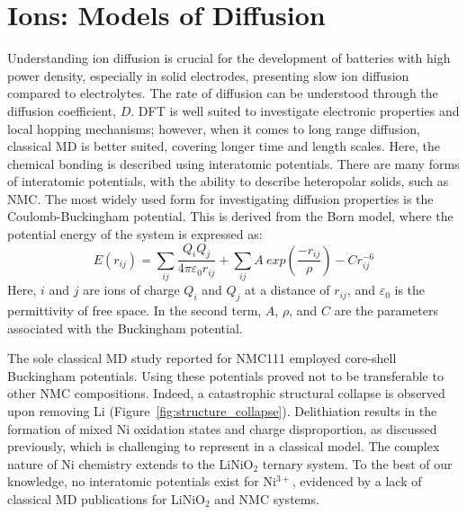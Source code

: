 \documentclass[journal=jacsat,manuscript=article]{achemso}
\begin{document}
\section*{Ions: Models of Diffusion}
Understanding ion diffusion is crucial for the development of batteries with high power density, especially in solid electrodes, presenting slow ion diffusion compared to electrolytes. 
The rate of diffusion can be understood through the diffusion coefficient, $D$. 
DFT is well suited to investigate electronic properties and local hopping mechanisms;\cite{van_der_ven_layered_2001, van_der_ven_LiTiS2_2008} however, when it comes to long range diffusion, classical MD is better suited, covering longer time and length scales. 
Here, the chemical bonding is described using interatomic potentials. 
There are many forms of interatomic potentials, with the ability to describe heteropolar solids, such as NMC. 
The most widely used form for investigating diffusion properties is the Coulomb-Buckingham potential.\cite{buckingham_classical_1938} 
This is derived from the Born model\cite{born_1932, mayer_1932}, where the potential energy of the system is expressed as:
%
\begin{equation}
    E(r_{ij}) =  \sum_{ij} \frac{Q_i Q_j}{4\pi \varepsilon_0 r_{ij}} + \sum_{ij} A \ exp(\frac{-r_{ij}}{\rho}) - Cr_{ij}^{-6}
\end{equation}
%
Here, $i$ and $j$ are ions of charge $Q_i$ and $Q_j$ at a distance of $r_{ij}$, and $\varepsilon_0$ is the permittivity of free space. In the second term, $A$, $\rho$, and $C$ are the parameters associated with the Buckingham potential.

The sole classical MD study reported for NMC111 employed core-shell Buckingham potentials.\cite{Lee_and_Park_2012}
Using these potentials proved not to be transferable to other NMC compositions. 
Indeed, a catastrophic structural collapse is observed upon removing Li (Figure~\ref{fig:structure_collapse}). 
Delithiation results in the formation of mixed Ni oxidation states and charge disproportion, as discussed previously, which is challenging to represent in a classical model.\cite{Nakamura_2019,Kim_2002,Alonso_1999} 
The complex nature of Ni chemistry extends to the LiNiO$_2$ ternary system. To the best of our knowledge, no interatomic potentials exist for Ni$^{3+}$, evidenced by a lack of classical MD publications for LiNiO$_2$ and NMC systems.
\end{document}
